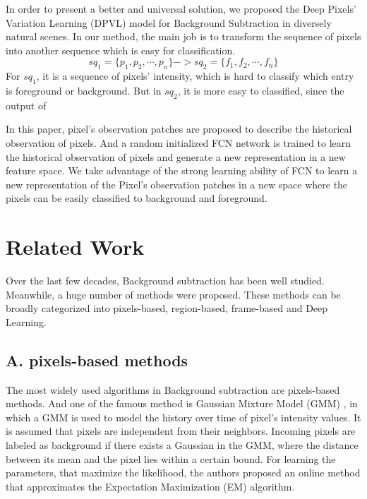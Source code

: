 \documentclass[journal]{IEEEtran}
\begin{document}
In order to present a better and universal solution, we proposed the Deep Pixels’ Variation Learning (DPVL) model for Background Subtraction in diversely natural scenes.
In our method, the main job is to transform the sequence of pixels into another sequence which is easy for classification.
\begin{equation}
    sq_1 = \{p_1,p_2,\cdots, p_n\} -> sq_2 = \{f_1, f_2, \cdots, f_n\}
\end{equation}
For $sq_1$, it is a sequence of pixels' intensity, which is hard to classify which entry is foreground or background.
%
But in $sq_2$, it is more easy to classified, since the output of

In this paper, pixel’s observation patches are proposed to describe the historical observation of pixels.
And a random initialized FCN network is trained to learn the historical observation of pixels and generate a new representation in a new feature space.
We take advantage of the strong learning ability of FCN to learn a new representation of the Pixel’s observation patches in a new space where the pixels can be easily classified to background and foreground.

\section{Related Work}
Over the last few decades, Background subtraction has been well studied. Meanwhile, a huge number of methods were proposed. These methods can be broadly categorized into pixels-based, region-based, frame-based and Deep Learning.

\subsection{A. pixels-based methods}
\label{sec_spa}
The most widely used algorithms in Background subtraction are pixels-based methods.
And one of the famous method is Gaussian Mixture Model (GMM) \cite{Zivkovic2004}, in which a GMM is used to model the history over time of pixel’s intensity values.
It is assumed that pixels are independent from their neighbors.
Incoming pixels are labeled as background if there exists a Gaussian in the GMM, where the distance between its mean and the pixel lies within a certain bound.
For learning the parameters, that maximize the likelihood, the authors proposed an online method that approximates the Expectation Maximization (EM) algorithm.
\end{document}
